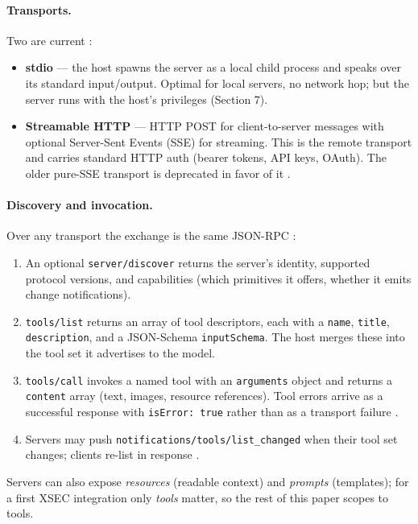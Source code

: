 \documentclass[11pt]{article}
\begin{document}
\paragraph{Transports.} Two are current \cite{mcp-arch}:
\begin{itemize}[leftmargin=*]
  \item \textbf{stdio} --- the host spawns the server as a local child process
  and speaks over its standard input/output. Optimal for local servers, no
  network hop; but the server runs with the host's privileges (Section 7).
  \item \textbf{Streamable HTTP} --- HTTP POST for client-to-server messages
  with optional Server-Sent Events (SSE) for streaming. This is the remote
  transport and carries standard HTTP auth (bearer tokens, API keys, OAuth).
  The older pure-SSE transport is deprecated in favor of it
  \cite{claudecode-mcp}.
\end{itemize}

\paragraph{Discovery and invocation.} Over any transport the exchange is the
same JSON-RPC \cite{mcp-arch}:
\begin{enumerate}[leftmargin=*]
  \item An optional \texttt{server/discover} returns the server's identity,
  supported protocol versions, and capabilities (which primitives it offers,
  whether it emits change notifications).
  \item \texttt{tools/list} returns an array of tool descriptors, each with a
  \texttt{name}, \texttt{title}, \texttt{description}, and a JSON-Schema
  \texttt{inputSchema}. The host merges these into the tool set it advertises to
  the model.
  \item \texttt{tools/call} invokes a named tool with an \texttt{arguments}
  object and returns a \texttt{content} array (text, images, resource
  references). Tool errors arrive as a successful response with
  \texttt{isError: true} rather than as a transport failure
  \cite{mcp-clientbp}.
  \item Servers may push \texttt{notifications/tools/list\_changed} when their
  tool set changes; clients re-list in response \cite{mcp-arch}.
\end{enumerate}

Servers can also expose \emph{resources} (readable context) and \emph{prompts}
(templates); for a first XSEC integration only \emph{tools} matter, so the rest
of this paper scopes to tools.
\end{document}

